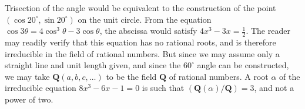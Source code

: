 \documentclass[10pt,leqno]{article}
\theoremstyle{definition}
\def\QQ{\mathbf{Q}}
\begin{document}
Trisection of the angle would be equivalent to the construction of the point $(\cos 20^\circ, \sin 20^\circ)$ on the unit circle.
From the equation $\cos 3\theta = 4 \cos^3 \theta - 3 \cos \theta$, the abscissa would satisfy $4x^3 - 3x = \frac12$.
The reader may readily verify that this equation has no rational roots, and is therefore irreducible in the field of rational numbers.
But since we may assume only a straight line and unit length given, and since the $60^\circ$ angle can be constructed, we may take $\QQ(a,b,c,\ldots)$ to be the field $\QQ$ of rational numbers.
A root $\alpha$ of the irreducible equation $8x^3 - 6x - 1 = 0$ is such that $(\QQ(\alpha) / \QQ) = 3$, and not a power of two.
\end{document}
